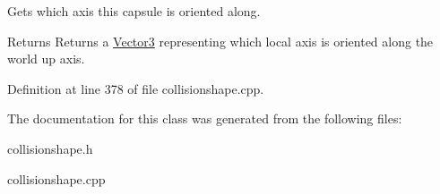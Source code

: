 Gets which axis this capsule is oriented along. 

\begin{DoxyReturn}{Returns}
Returns a \hyperlink{classphys_1_1Vector3}{Vector3} representing which local axis is oriented along the world up axis. 
\end{DoxyReturn}


Definition at line 378 of file collisionshape.cpp.



The documentation for this class was generated from the following files:\begin{DoxyCompactItemize}
\item 
collisionshape.h\item 
collisionshape.cpp\end{DoxyCompactItemize}
